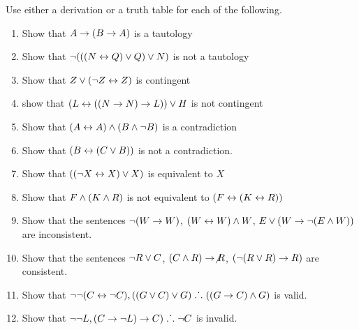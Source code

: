 \noindent\problempart Use either a derivation or a truth table for each of the following. 
\begin{enumerate}%
\item Show that $A \rightarrow (B \rightarrow A)$ is a tautology
\item Show that $\neg (((N \leftrightarrow Q) \vee Q) \vee N)$ is not a tautology
\item Show that $ Z \vee (\neg Z \leftrightarrow Z) $ is contingent
\item show that $ (L \leftrightarrow ((N \rightarrow N) \rightarrow L)) \vee H $ is not contingent
\item Show that $ (A \leftrightarrow A) \wedge (B \wedge \neg B)$ is a contradiction
\item Show that $ (B \leftrightarrow (C \vee B)) $ is not a contradiction.
\item Show that $ ((\neg X \leftrightarrow X) \vee X) $ is equivalent to $X$
\item Show that $F \wedge (K \wedge R) $ is not equivalent to $ (F \leftrightarrow (K \leftrightarrow R)) $
\item Show that the sentences $ \neg (W \rightarrow W)$, $(W \leftrightarrow W) \wedge W$, $E \vee (W \rightarrow \neg (E \wedge W))$ are inconsistent.
\item Show that the sentences  $\neg R \vee C $, $(C \wedge R) \rightarrow \not R$, $(\neg (R \vee R) \rightarrow R) $ are consistent.
\item Show that $\neg \neg (C \leftrightarrow \neg C), ((G \vee C) \vee G) \mathrel{\ldotp\dot{}\,\ldotp} ((G \rightarrow C) \wedge G) $ is valid.
\item Show that $ \neg \neg L,  (C \rightarrow \neg L) \rightarrow C) \mathrel{\ldotp\dot{}\,\ldotp} \neg C$ is invalid. 
\end{enumerate}

